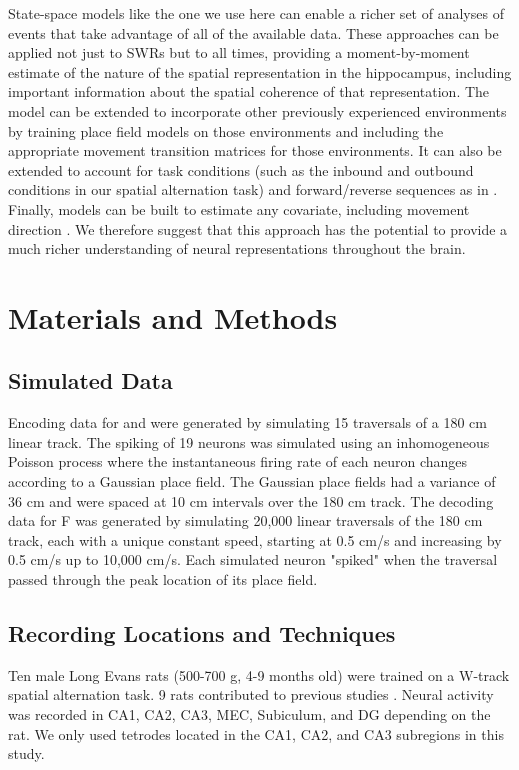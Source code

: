 \documentclass[9pt,lineno]{elife}
\begin{document}
State-space models like the one we use here can enable a richer set of analyses of events that take advantage of all of the available data. These approaches can be applied not just to SWRs but to all times, providing a moment-by-moment estimate of the nature of the spatial representation in the hippocampus, including important information about the spatial coherence of that representation. The model can be extended to incorporate other previously experienced environments by training place field models on those environments and including the appropriate movement transition matrices for those environments. It can also be extended to account for task conditions (such as the inbound and outbound conditions in our spatial alternation task) and forward/reverse sequences as in \cite{DengRapidclassificationhippocampal2016}. Finally, models can be built to estimate any covariate, including movement direction \citep{KayConstantSubsecondCycling2020}. We therefore suggest that this approach has the potential to provide a much richer understanding of neural representations throughout the brain. 

\section*{Materials and Methods}

\subsection*{Simulated Data}
Encoding data for  and  were generated by simulating 15 traversals of a 180 cm linear track. The spiking of 19 neurons was simulated using an inhomogeneous Poisson process where the instantaneous firing rate of each neuron changes according to a Gaussian place field. The Gaussian place fields had a variance of 36 cm and were spaced at 10 cm intervals over the 180 cm track. The decoding data for F was generated by simulating 20,000 linear traversals of the 180 cm track, each with a unique constant speed, starting at 0.5 cm/s and increasing by 0.5 cm/s up to 10,000 cm/s. Each simulated neuron "spiked" when the traversal passed through the peak location of its place field.

\subsection*{Recording Locations and Techniques}
Ten male Long Evans rats (500-700 g, 4-9 months old) were trained on a W-track spatial alternation task. 9 rats contributed to previous studies \citep{KarlssonAwakereplayremote2009, CarrTransientSlowGamma2012, Kayhippocampalnetworkspatial2016, KayConstantSubsecondCycling2020}. Neural activity was recorded in CA1, CA2, CA3, MEC, Subiculum, and DG depending on the rat. We only used tetrodes located in the CA1, CA2, and CA3 subregions in this study.
\end{document}
